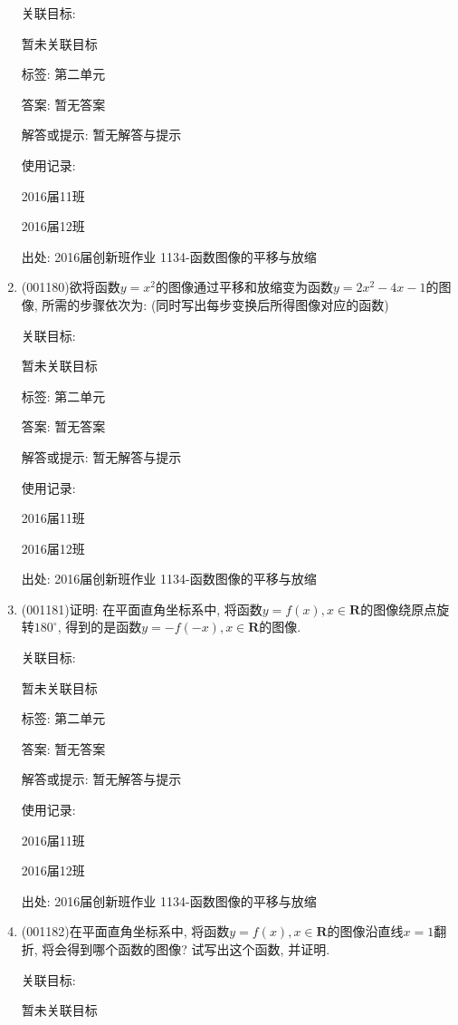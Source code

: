 \documentclass[10pt,a4paper]{article}
\begin{document}
\begin{enumerate}[1.]
关联目标:

暂未关联目标



标签: 第二单元

答案: 暂无答案

解答或提示: 暂无解答与提示

使用记录:

2016届11班	

2016届12班	


出处: 2016届创新班作业	1134-函数图像的平移与放缩
\item { (001180)}欲将函数$y=x^2$的图像通过平移和放缩变为函数$y=2x^2-4x-1$的图像, 所需的步骤依次为: (同时写出每步变换后所得图像对应的函数)


关联目标:

暂未关联目标



标签: 第二单元

答案: 暂无答案

解答或提示: 暂无解答与提示

使用记录:

2016届11班	

2016届12班	


出处: 2016届创新班作业	1134-函数图像的平移与放缩
\item { (001181)}证明: 在平面直角坐标系中, 将函数$y=f(x),x\in \mathbf{R}$的图像绕原点旋转$180^\circ$, 得到的是函数$y=-f(-x),x\in \mathbf{R}$的图像.


关联目标:

暂未关联目标



标签: 第二单元

答案: 暂无答案

解答或提示: 暂无解答与提示

使用记录:

2016届11班	

2016届12班	


出处: 2016届创新班作业	1134-函数图像的平移与放缩
\item { (001182)}在平面直角坐标系中, 将函数$y=f(x),x\in \mathbf{R}$的图像沿直线$x=1$翻折, 将会得到哪个函数的图像? 试写出这个函数, 并证明.


关联目标:

暂未关联目标




\end{enumerate}
\end{document}
